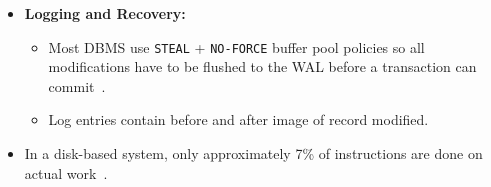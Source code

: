 \documentclass[11pt]{article}
\begin{document}
\begin{itemize}
\begin{itemize}
    \end{itemize}
    
    \item \textbf{Logging and Recovery:}
    \begin{itemize}
        \item
        Most DBMS use \texttt{STEAL} + \texttt{NO-FORCE} buffer pool policies so all modifications 
        have to be flushed to the WAL before a transaction can commit~\cite{franklin14}.
        
        \item
        Log entries contain before and after image of record modified.
    \end{itemize}

    \item
    In a disk-based system, only approximately 7\% of instructions are done on actual 
    work~\cite{harizopoulos08}.
    
\end{itemize}
\end{document}
